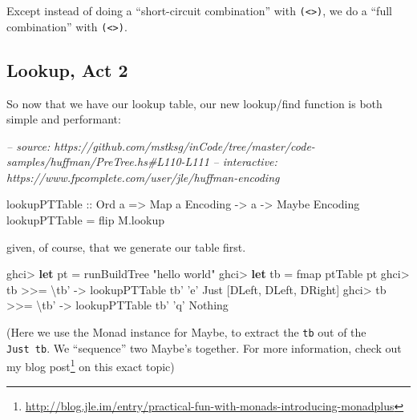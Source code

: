 \documentclass[]{article}
\newenvironment{Shaded}{}{}
\newcommand{\CharTok}[1]{\textcolor[rgb]{0.25,0.44,0.63}{#1}}
\newcommand{\CommentTok}[1]{\textcolor[rgb]{0.38,0.63,0.69}{\textit{#1}}}
\newcommand{\DataTypeTok}[1]{\textcolor[rgb]{0.56,0.13,0.00}{#1}}
\newcommand{\FunctionTok}[1]{\textcolor[rgb]{0.02,0.16,0.49}{#1}}
\newcommand{\KeywordTok}[1]{\textcolor[rgb]{0.00,0.44,0.13}{\textbf{#1}}}
\newcommand{\NormalTok}[1]{#1}
\newcommand{\OtherTok}[1]{\textcolor[rgb]{0.00,0.44,0.13}{#1}}
\newcommand{\StringTok}[1]{\textcolor[rgb]{0.25,0.44,0.63}{#1}}
\renewcommand{\href}[2]{#2\footnote{\url{#1}}}
\begin{document}
Except instead of doing a ``short-circuit combination'' with
\texttt{(\textless{}\textbar{}\textgreater{})}, we do a ``full combination''
with \texttt{(\textless{}\textgreater{})}.

\hypertarget{lookup-act-2}{%
\subsection{Lookup, Act 2}\label{lookup-act-2}}

So now that we have our lookup table, our new lookup/find function is both
simple and performant:

\begin{Shaded}
\begin{Highlighting}[]
\CommentTok{-- source: https://github.com/mstksg/inCode/tree/master/code-samples/huffman/PreTree.hs#L110-L111}
\CommentTok{-- interactive: https://www.fpcomplete.com/user/jle/huffman-encoding}

\OtherTok{lookupPTTable ::} \DataTypeTok{Ord}\NormalTok{ a }\OtherTok{=>} \DataTypeTok{Map}\NormalTok{ a }\DataTypeTok{Encoding} \OtherTok{->}\NormalTok{ a }\OtherTok{->} \DataTypeTok{Maybe} \DataTypeTok{Encoding}
\NormalTok{lookupPTTable }\FunctionTok{=}\NormalTok{ flip M.lookup}
\end{Highlighting}
\end{Shaded}

given, of course, that we generate our table first.

\begin{Shaded}
\begin{Highlighting}[]
\NormalTok{ghci}\FunctionTok{>} \KeywordTok{let}\NormalTok{ pt }\FunctionTok{=}\NormalTok{ runBuildTree }\StringTok{"hello world"}
\NormalTok{ghci}\FunctionTok{>} \KeywordTok{let}\NormalTok{ tb }\FunctionTok{=}\NormalTok{ fmap ptTable pt}
\NormalTok{ghci}\FunctionTok{>}\NormalTok{ tb }\FunctionTok{>>=}\NormalTok{ \textbackslash{}tb' }\OtherTok{->}\NormalTok{ lookupPTTable tb' }\CharTok{'e'}
\DataTypeTok{Just}\NormalTok{ [}\DataTypeTok{DLeft}\NormalTok{, }\DataTypeTok{DLeft}\NormalTok{, }\DataTypeTok{DRight}\NormalTok{]}
\NormalTok{ghci}\FunctionTok{>}\NormalTok{ tb }\FunctionTok{>>=}\NormalTok{ \textbackslash{}tb' }\OtherTok{->}\NormalTok{ lookupPTTable tb' }\CharTok{'q'}
\DataTypeTok{Nothing}
\end{Highlighting}
\end{Shaded}

(Here we use the Monad instance for Maybe, to extract the
\texttt{tb\textquotesingle{}} out of the \texttt{Just\ tb}. We ``sequence'' two
Maybe's together. For more information, check out my
\href{http://blog.jle.im/entry/practical-fun-with-monads-introducing-monadplus}{blog
post} on this exact topic)
\end{document}
